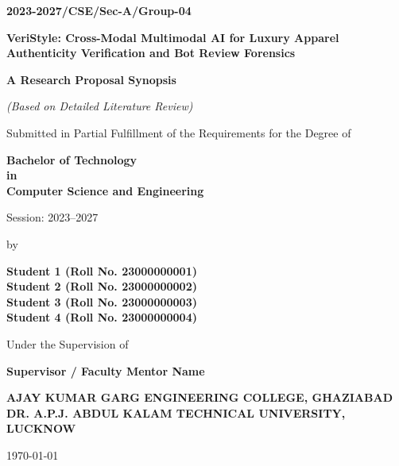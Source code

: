 \documentclass[a4paper,12pt]{report}
\newcommand{\reporttitle}{VeriStyle: Cross-Modal Multimodal AI for Luxury Apparel Authenticity Verification and Bot Review Forensics}
\newcommand{\session}{2023--2027}
\newcommand{\batchcode}{2023-2027/CSE/Sec-A/Group-04}
\newcommand{\degree}{Bachelor of Technology\\in\\Computer Science and Engineering}
\newcommand{\students}{Student 1 (Roll No. 23000000001)\\Student 2 (Roll No. 23000000002)\\Student 3 (Roll No. 23000000003)\\Student 4 (Roll No. 23000000004)}
\newcommand{\mentor}{Supervisor / Faculty Mentor Name}
\newcommand{\university}{AJAY KUMAR GARG ENGINEERING COLLEGE, GHAZIABAD\\DR. A.P.J. ABDUL KALAM TECHNICAL UNIVERSITY, LUCKNOW}
\newcommand{\submissiondate}{\today}
\begin{document}
\begin{titlepage}
\begin{flushright}
\textbf{\batchcode}
\end{flushright}

\begin{center}
\vspace*{0.5cm}
{\Large\textbf{\reporttitle}\par}
\vspace{1.2cm}
{\large\textbf{A Research Proposal Synopsis}\par}
{\large\textit{(Based on Detailed Literature Review)}\par}
\vspace{1.2cm}
Submitted in Partial Fulfillment of the Requirements for the Degree of\par
\vspace{0.4cm}
{\large\textbf{\degree}\par}
\vspace{0.8cm}
Session: \session\par
\vspace{0.8cm}
by\par
\vspace{0.4cm}
{\large\textbf{\students}\par}
\vspace{1.0cm}
Under the Supervision of\par
\vspace{0.4cm}
{\large\textbf{\mentor}\par}
\vspace{1.2cm}
{\large\textbf{\university}\par}
\vfill
{\large\submissiondate\par}
\vspace*{0.5cm}
\end{center}
\end{titlepage}

\onehalfspacing
{}
\newpage

\newpage

\newpage

\newpage
\tableofcontents
\newpage
\listoffigures
\newpage
\listoftables

\newpage

\newpage

\newpage

\newpage

\newpage

\newpage

\newpage


\newpage
{}
\printbibliography
\end{document}
